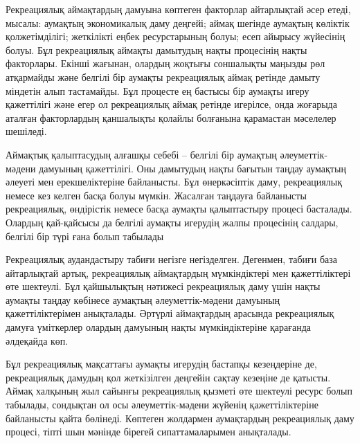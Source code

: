 Рекреациялық аймақтардың дамуына көптеген факторлар айтарлықтай әсер
етеді, мысалы: аумақтың экономикалық даму деңгейі; аймақ шегінде
аумақтың көліктік қолжетімділігі; жеткілікті еңбек ресурстарының болуы;
есеп айырысу жүйесінің болуы. Бұл рекреациялық аймақты дамытудың нақты
процесінің нақты факторлары. Екінші жағынан, олардың жоқтығы соншалықты
маңызды рөл атқармайды және белгілі бір аумақты рекреациялық аймақ
ретінде дамыту міндетін алып тастамайды. Бұл процесте ең бастысы бір
аумақты игеру қажеттілігі және егер ол рекреациялық аймақ ретінде
игерілсе, онда жоғарыда аталған факторлардың қаншалықты қолайлы
болғанына қарамастан мәселелер шешіледі.

Аймақтық қалыптасудың алғашқы себебі -- белгілі бір аумақтың
әлеуметтік-мәдени дамуының қажеттілігі. Оны дамытудың нақты бағытын
таңдау аумақтың әлеуеті мен ерекшеліктеріне байланысты. Бұл өнеркәсіптік
даму, рекреациялық немесе кез келген басқа болуы мүмкін. Жасалған
таңдауға байланысты рекреациялық, өндірістік немесе басқа аумақты
қалыптастыру процесі басталады. Олардың қай-қайсысы да белгілі аумақты
игерудің жалпы процесінің салдары, белгілі бір түрі ғана болып табылады

Рекреациялық аудандастыру табиғи негізге негізделген. Дегенмен, табиғи
база айтарлықтай артық, рекреациялық аймақтардың мүмкіндіктері мен
қажеттіліктері өте шектеулі. Бұл қайшылықтың нәтижесі рекреациялық даму
үшін нақты аумақты таңдау көбінесе аумақтың әлеуметтік-мәдени дамуының
қажеттіліктерімен анықталады. Әртүрлі аймақтардың арасында рекреациялық
дамуға үміткерлер олардың дамуының нақты мүмкіндіктеріне қарағанда
әлдеқайда көп.

Бұл рекреациялық мақсаттағы аумақты игерудің бастапқы кезеңдеріне де,
рекреациялық дамудың қол жеткізілген деңгейін сақтау кезеңіне де
қатысты. Аймақ халқының жыл сайынғы рекреациялық қызметі өте шектеулі
ресурс болып табылады, сондықтан ол осы әлеуметтік-мәдени жүйенің
қажеттіліктеріне байланысты қайта бөлінеді. Көптеген жолдармен
аумақтардың рекреациялық даму процесі, тіпті шын мәнінде бірегей
сипаттамаларымен анықталады.

